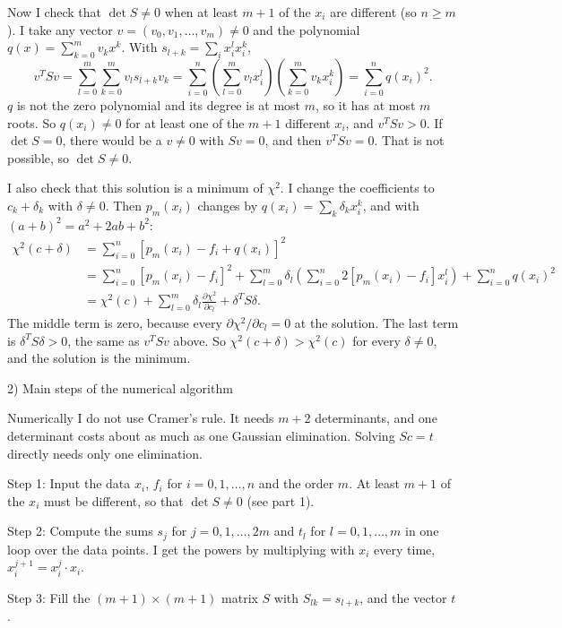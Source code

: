 \documentclass[11pt]{article}
\begin{document}
Now I check that $\det S \neq 0$ when at least $m+1$ of the $x_i$ are different (so $n \geq m$). I take any vector $v = (v_0, v_1, \dots, v_m) \neq 0$ and the polynomial $q(x) = \sum_{k=0}^{m} v_k x^k$. With $s_{l+k} = \sum_i x_i^l x_i^k$,
\[
v^T S v = \sum_{l=0}^{m} \sum_{k=0}^{m} v_l s_{l+k} v_k
= \sum_{i=0}^{n} \left(\sum_{l=0}^{m} v_l x_i^l\right)\left(\sum_{k=0}^{m} v_k x_i^k\right)
= \sum_{i=0}^{n} q(x_i)^2.
\]
$q$ is not the zero polynomial and its degree is at most $m$, so it has at most $m$ roots. So $q(x_i) \neq 0$ for at least one of the $m+1$ different $x_i$, and $v^T S v > 0$.
If $\det S = 0$, there would be a $v \neq 0$ with $S v = 0$, and then $v^T S v = 0$. That is not possible, so $\det S \neq 0$.

I also check that this solution is a minimum of $\chi^2$. I change the coefficients to $c_k + \delta_k$ with $\delta \neq 0$. Then $p_m(x_i)$ changes by $q(x_i) = \sum_k \delta_k x_i^k$, and with $(a+b)^2 = a^2 + 2ab + b^2$:
\[
\begin{aligned}
\chi^2(c + \delta) &= \sum_{i=0}^{n} [p_m(x_i) - f_i + q(x_i)]^2 \\
&= \sum_{i=0}^{n} [p_m(x_i) - f_i]^2 + \sum_{l=0}^{m} \delta_l \left(\sum_{i=0}^{n} 2[p_m(x_i) - f_i] x_i^l\right) + \sum_{i=0}^{n} q(x_i)^2 \\
&= \chi^2(c) + \sum_{l=0}^{m} \delta_l \frac{\partial \chi^2}{\partial c_l} + \delta^T S \delta.
\end{aligned}
\]
The middle term is zero, because every $\partial \chi^2 / \partial c_l = 0$ at the solution. The last term is $\delta^T S \delta > 0$, the same as $v^T S v$ above. So $\chi^2(c + \delta) > \chi^2(c)$ for every $\delta \neq 0$, and the solution is the minimum.

2) Main steps of the numerical algorithm

Numerically I do not use Cramer's rule. It needs $m+2$ determinants, and one determinant costs about as much as one Gaussian elimination. Solving $S c = t$ directly needs only one elimination.

Step 1: Input the data $x_i$, $f_i$ for $i = 0, 1, \dots, n$ and the order $m$. At least $m+1$ of the $x_i$ must be different, so that $\det S \neq 0$ (see part 1).

Step 2: Compute the sums $s_j$ for $j = 0, 1, \dots, 2m$ and $t_l$ for $l = 0, 1, \dots, m$ in one loop over the data points. I get the powers by multiplying with $x_i$ every time, $x_i^{j+1} = x_i^j \cdot x_i$.

Step 3: Fill the $(m+1) \times (m+1)$ matrix $S$ with $S_{lk} = s_{l+k}$, and the vector $t$.
\end{document}
